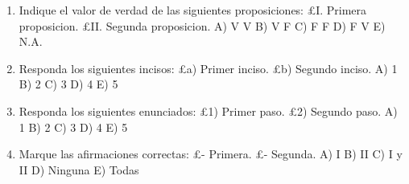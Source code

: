 \begin{enumerate}
\item[\textbf{1.}] Indique el valor de verdad de las siguientes proposiciones: £I. Primera proposicion. £II. Segunda proposicion. A) V V B) V F C) F F D) F V E) N.A.
\item[\textbf{2.}] Responda los siguientes incisos: £a) Primer inciso. £b) Segundo inciso. A) 1 B) 2 C) 3 D) 4 E) 5
\item[\textbf{3.}] Responda los siguientes enunciados: £1) Primer paso. £2) Segundo paso. A) 1 B) 2 C) 3 D) 4 E) 5
\item[\textbf{4.}] Marque las afirmaciones correctas: £- Primera. £- Segunda. A) I B) II C) I y II D) Ninguna E) Todas
\end{enumerate}